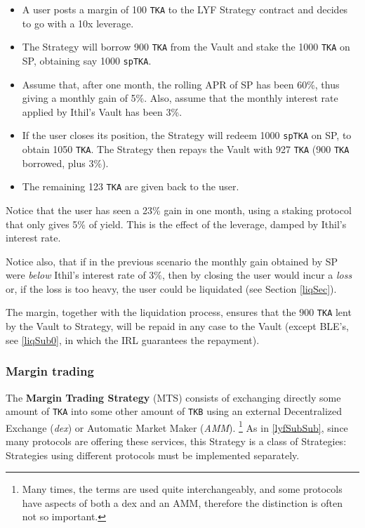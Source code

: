 \documentclass[a4paper,10 pt]{article}
\theoremstyle{definition}
\begin{document}
\begin{itemize}
\item A user posts a margin of 100 \verb|TKA| to the LYF Strategy contract and decides to go with a 10x leverage.
\item The Strategy will borrow 900 \verb|TKA| from the Vault and stake the 1000 \verb|TKA| on SP, obtaining say 1000 \verb|spTKA|.
\item Assume that, after one month, the rolling APR of SP has been 60\%, thus giving a monthly gain of 5\%. Also, assume that the monthly interest rate applied by Ithil's Vault has been 3\%.
\item If the user closes its position, the Strategy will redeem 1000 \verb|spTKA| on SP, to obtain 1050 \verb|TKA|. The Strategy then repays the Vault with 927 \verb|TKA| (900 \verb|TKA| borrowed, plus 3\%). 
\item The remaining 123 \verb|TKA| are given back to the user.
\end{itemize}
 Notice that the user has seen a 23\% gain in one month, using a staking protocol that only gives 5\% of yield. This is the effect of the leverage, damped by Ithil's interest rate.

Notice also, that if in the previous scenario the monthly gain obtained by SP were {\it below} Ithil's interest rate of $3\%$, then by closing the user would incur a {\it loss} or, if the loss is too heavy, the user could be liquidated (see Section \ref{liqSec}).

The margin, together with the liquidation process, ensures that the $900$ \verb|TKA| lent by the Vault to Strategy, will be repaid in any case to the Vault (except BLE's, see \ref{liqSub0}, in which the IRL guarantees the repayment).

\subsubsection{Margin trading}\label{mtSubSub}

The {\bf Margin Trading Strategy} (MTS) consists of exchanging directly some amount of \verb|TKA| into some other amount of \verb|TKB| using an external Decentralized Exchange ({\it dex}) or Automatic Market Maker ({\it AMM}). \footnote{Many times, the terms are used quite interchangeably, and some protocols have aspects of both a dex and an AMM, therefore the distinction is often not so important.}  As in \ref{lyfSubSub}, since many protocols are offering these services, this Strategy is a class of Strategies: Strategies using different protocols must be implemented separately.
\end{document}
